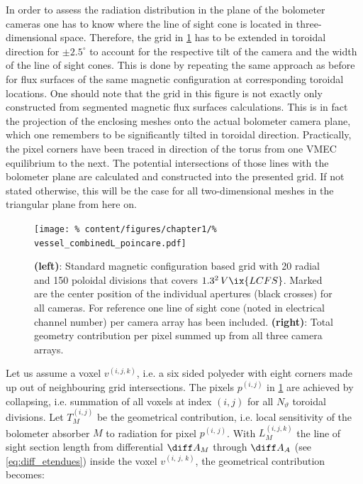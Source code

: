 %
                In order to assess the radiation distribution in the plane of the bolometer cameras one has to know where the line of sight cone is located in three-dimensional space. Therefore, the grid in \cref{fig:los_grid_emiss} has to be extended in toroidal direction for $\pm 2.5^{\circ}$ to account for the respective tilt of the camera and the width of the line of sight cones. This is done by repeating the same approach as before for flux surfaces of the same magnetic configuration at corresponding toroidal locations. One should note that the grid in this figure is not exactly only constructed from segmented magnetic flux surfaces calculations. This is in fact the projection of the enclosing meshes onto the actual bolometer camera plane, which one remembers to be significantly tilted in toroidal direction. Practically, the pixel corners have been traced in direction of the torus from one VMEC equilibrium to the next. The potential intersections of those lines with the bolometer plane are calculated and constructed into the presented grid. If not stated otherwise, this will be the case for all two-dimensional meshes in the triangular plane from here on.\\%
%
                \begin{figure}[t]%
                    \centering%
                    \texttt{[image: \%
                        content/figures/chapter1/\%
                        vessel\_combinedL\_poincare.pdf]}%
                    \caption{\textbf{(left)}: Standard magnetic configuration based grid with 20 radial and 150 poloidal divisions that covers $1.3^2\,V\ix{LCFS}$. Marked are the center position of the individual apertures (black crosses) for all cameras. For reference one line of sight cone (noted in electrical channel number) per camera array has been included. \textbf{(right)}: Total geometry contribution per pixel summed up from all three camera arrays.}\label{fig:los_grid_emiss}%
                \end{figure}%
%
                Let us assume a voxel $v^{\left(i,j,k\right)}$, i.e. a six sided polyeder with eight corners made up out of neighbouring grid intersections. The pixels $p^{\left(i,j\right)}$ in \cref{fig:los_grid_emiss} are achieved by collapsing, i.e. summation of all voxels at index $\left(i,j\right)$ for all $N_{\vartheta}$ toroidal divisions. Let $T^{\left(i,j\right)}_{M}$ be the geometrical contribution, i.e. local sensitivity of the bolometer absorber $M$ to radiation for pixel $p^{\left(i,\,j\right)}$. With $L^{\left(i,j,k\right)}_{M}$ the line of sight section length from differential $\diff A_{M}$ through $\diff A_{A}$ (see \cref{eq:diff_etendues}) inside the voxel $v^{\left(i,\,j,\,k\right)}$, the geometrical contribution becomes:%
